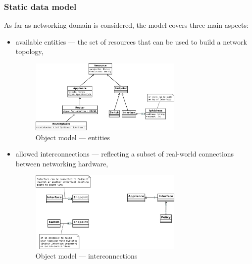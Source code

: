 \documentclass[11pt]{book}
\begin{document}
        \subsubsection{Static data model}

          As far as networking domain is considered, the model covers three main aspects:

          \begin{itemize}

            \item available entities --- the set of resources that can be used to build a network topology,

                  \begin{figure}[H]
                    \begin{center}
                      \includegraphics[width=0.7\textwidth]{img/architecture/om-entities.pdf}
                    \end{center}
                    \caption{Object model --- entities}
                  \end{figure}

            \item allowed interconnections --- reflecting a subset of real-world connections between networking
                  hardware,

                  \begin{figure}[H]
                    \begin{center}
                      \includegraphics[width=0.7\textwidth]{img/architecture/om-ic.pdf}
                    \end{center}
                    \caption{Object model --- interconnections}
                  \end{figure}


\end{itemize}
\end{document}
